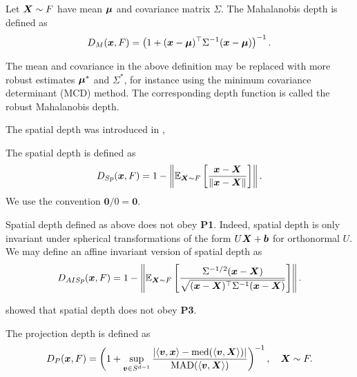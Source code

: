 \begin{definition}
    Let $\bm{X} \sim F$ have mean $\bm{\mu}$ and covariance matrix $\Sigma$.
    The Mahalanobis depth is defined as
    \begin{equation}
        D_{M}(\bm{x}, F) = \left(1 + (\bm{x} - \bm{\mu})^\top \Sigma^{-1}(\bm{x} - \bm{\mu})\right)^{-1}.
    \end{equation}
\end{definition}

\begin{remark}
    The mean and covariance in the above definition may be replaced with more
    robust estimates $\bm{\mu}^*$ and $\Sigma^*$, for instance using the minimum
    covariance determinant (MCD) method.
    The corresponding depth function is called the robust Mahalanobis depth.
\end{remark}


The spatial depth was introduced in \textcite{serfling-2002},

\begin{definition}
    The spatial depth is defined as
    \begin{equation}
        D_{Sp}(\bm{x}, F) = 1 - \left\Vert \operatorname{\mathbb{E}}_{\bm{X} \sim F}\left[\frac{\bm{x} - \bm{X}}{\Vert \bm{x} - \bm{X} \Vert}\right] \right\Vert.
    \end{equation}
    We use the convention $\bm0/0 = \bm0$.
\end{definition}

\begin{remark}
    Spatial depth defined as above does not obey \textbf{P1}.
    Indeed, spatial depth is only invariant under spherical transformations of
    the form $U\bm{X} + \bm{b}$ for orthonormal $U$.
    We may define an affine invariant version of spatial depth as
    \begin{equation}
        D_{AISp}(\bm{x}, F) = 1 - \left\Vert \operatorname{\mathbb{E}}_{\bm{X} \sim F}\left[\frac{\Sigma^{-1/2}(\bm{x} - \bm{X})}{\sqrt{(\bm{x} - \bm{X})^\top\Sigma^{-1}(\bm{x} - \bm{X})}}\right] \right\Vert.
    \end{equation}
\end{remark}

\begin{remark}
    \textcite{nagy-2017} showed that spatial depth does not obey \textbf{P3}.
\end{remark}


\begin{definition}
    The projection depth is defined as
    \begin{equation}
        D_P(\bm{x}, F) = \left(1 + \sup_{\bm{v} \in S^{d - 1}} \frac{|\langle \bm{v}, \bm{x} \rangle - \operatorname{med}(\langle \bm{v}, \bm{X} \rangle)|}{\operatorname{MAD}(\langle \bm{v}, \bm{X} \rangle)}\right)^{-1}, \quad
        \bm{X} \sim F.
    \end{equation}
\end{definition}

